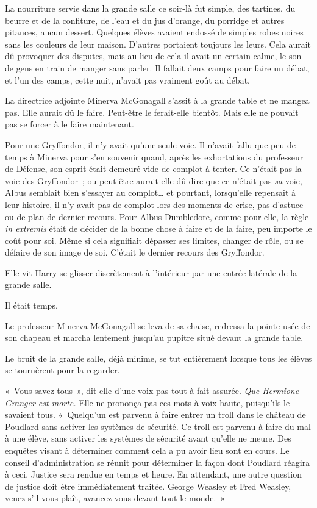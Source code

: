 \later

La nourriture servie dans la grande salle ce soir-là fut simple, des tartines, du beurre et de la confiture, de l'eau et du jus d'orange, du porridge et autres pitances, aucun dessert.
Quelques élèves avaient endossé de simples robes noires sans les couleurs de leur maison.
D'autres portaient toujours les leurs.
Cela aurait dû provoquer des disputes, mais au lieu de cela il avait un certain calme, le son de gens en train de manger sans parler.
Il fallait deux camps pour faire un débat, et l'un des camps, cette nuit, n'avait pas vraiment goût au débat.

La directrice adjointe Minerva McGonagall s'assit à la grande table et ne mangea pas.
Elle aurait dû le faire.
Peut-être le ferait-elle bientôt.
Mais elle ne pouvait pas se forcer à le faire maintenant.

Pour une Gryffondor, il n'y avait qu'une seule voie.
Il n'avait fallu que peu de temps à Minerva pour s'en souvenir quand, après les exhortations du professeur de Défense, son esprit était demeuré vide de complot à tenter.
Ce n'était pas la voie des Gryffondor~; ou peut-être aurait-elle dû dire que ce n'était pas \emph{sa} voie, Albus semblait bien s'essayer au complot… et pourtant, lorsqu'elle repensait à leur histoire, il n'y avait pas de complot lors des moments de crise, pas d'astuce ou de plan de dernier recours.
Pour Albus Dumbledore, comme pour elle, la règle \emph{in extremis} était de décider de la bonne chose à faire et de la faire, peu importe le coût pour soi.
Même si cela signifiait dépasser ses limites, changer de rôle, ou se défaire de son image de soi.
C'était le dernier recours des Gryffondor.

Elle vit Harry se glisser discrètement à l'intérieur par une entrée latérale de la grande salle.

Il était temps.

Le professeur Minerva McGonagall se leva de sa chaise, redressa la pointe usée de son chapeau et marcha lentement jusqu'au pupitre situé devant la grande table.

Le bruit de la grande salle, déjà minime, se tut entièrement lorsque tous les élèves se tournèrent pour la regarder.

«~Vous savez tous~», dit-elle d'une voix pas tout à fait assurée.
\emph{Que Hermione Granger est morte.} Elle ne prononça pas ces mots à voix haute, puisqu'ils le savaient tous.
«~Quelqu'un est parvenu à faire entrer un troll dans le château de Poudlard sans activer les systèmes de sécurité.
Ce troll est parvenu à faire du mal à une élève, sans activer les systèmes de sécurité avant qu'elle ne meure.
Des enquêtes visant à déterminer comment cela a pu avoir lieu sont en cours.
Le conseil d'administration se réunit pour déterminer la façon dont Poudlard réagira à ceci.
Justice sera rendue en temps et heure.
En attendant, une autre question de justice doit être immédiatement traitée.
George Weasley et Fred Weasley, venez s'il vous plaît, avancez-vous devant tout le monde.~»

